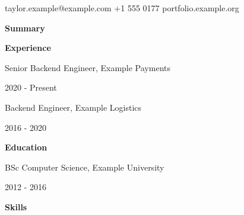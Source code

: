 \documentclass[10pt]{article}
\begin{document}
{\LARGE \Person}\par taylor.example@example.com \quad +1 555 0177 \quad portfolio.example.org\par\bigskip
\textbf{Summary}\par \Summary\par\medskip
\textbf{Experience}\par Senior Backend Engineer, Example Payments\par
\JobA\par \JobB\par 2020 - Present\par\medskip
Backend Engineer, Example Logistics\par \JobC\par 2016 - 2020\par\medskip
\textbf{Education}\par BSc Computer Science, Example University\par 2012 - 2016\par\medskip
\textbf{Skills}\par \SkillsLine\par
\end{document}
